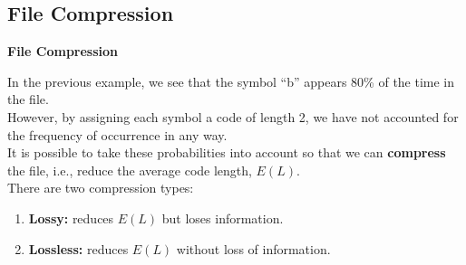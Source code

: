 \documentclass[compress]{beamer}        %
\makeatletter
\newcommand{\tcb}{\textcolor{beamer@blendedblue}}
\makeatother
\begin{document}
\subsection{File Compression}
\begin{frame}{\bf \tcb{File Compression}}

In the previous example, we see that the symbol ``b'' appears 80\% of the time in the file.\\[0.6cm]

However, by assigning each symbol a code of length 2, we have not accounted for the frequency of occurrence in any way.\\[0.6cm]

It is possible to take these probabilities into account so that we can {\bf compress} the file, i.e., reduce the average code length, $E(L)$.\\[0.6cm]

There are two compression types:\\
\begin{enumerate}[1.]\itemsep0.3cm
\item {\bf Lossy:} reduces $E(L)$ but loses information.
\item {\bf Lossless:} reduces $E(L)$ without loss of information.
\end{enumerate}


\end{frame}
\end{document}
